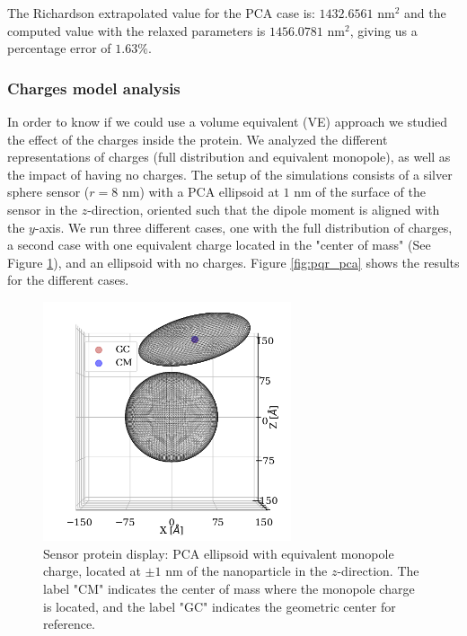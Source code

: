 The Richardson extrapolated value for the PCA case is: $1432.6561$ nm$^2$ and the computed value with the relaxed parameters 
is $1456.0781$ nm$^2$, giving us a percentage error of $1.63 \%$. 

\subsubsection{Charges model analysis} \label{ssub:pqr_analysis}

In order to know if we could use a volume equivalent (VE) approach we studied the effect of the charges inside the protein. We analyzed
the different representations of charges (full distribution and equivalent monopole), as well as the impact of having
no charges. The setup of the simulations consists of a silver sphere sensor ($r=8$ nm) with a PCA ellipsoid 
at $1$ nm of the surface of the sensor in the $z$-direction, oriented such that the dipole moment is aligned with the $y$-axis. We run 
three different cases, one with the full distribution of charges, a second case with one equivalent charge located in the
"center of mass" (See Figure \ref{fig:one_pca_cm_sketch}), and an ellipsoid with no charges. Figure 
\ref{fig:pqr_pca} shows the results for the different cases.

\begin{figure}%
    \centering
    \includegraphics[width=0.65\textwidth]{viz/one_pca_cm_gc_display.png} 
    \caption{Sensor protein display: PCA ellipsoid with equivalent monopole charge, located at $\pm 1$ nm of the 
    nanoparticle in the $z$-direction. The label "CM" indicates the center of mass where the monopole charge is located, and
    the label "GC" indicates the geometric center for reference.}
    \label{fig:one_pca_cm_sketch}
 \end{figure}

